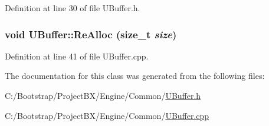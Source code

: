 Definition at line 30 of file UBuffer.h.\hypertarget{class_u_buffer_d30479ef19c7c97a705fe2aa6070b774}{
\subsubsection[{ReAlloc}]{\setlength{\rightskip}{0pt plus 5cm}void UBuffer::ReAlloc (size\_\-t {\em size})}}
\label{class_u_buffer_d30479ef19c7c97a705fe2aa6070b774}




Definition at line 41 of file UBuffer.cpp.

The documentation for this class was generated from the following files:\begin{CompactItemize}
\item 
C:/Bootstrap/ProjectBX/Engine/Common/\hyperlink{_u_buffer_8h}{UBuffer.h}\item 
C:/Bootstrap/ProjectBX/Engine/Common/\hyperlink{_u_buffer_8cpp}{UBuffer.cpp}\end{CompactItemize}
